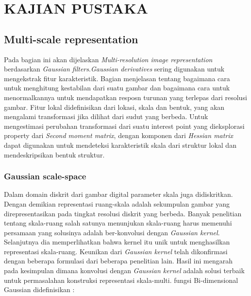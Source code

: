 
\chapter{KAJIAN PUSTAKA}

\section{\textbf{Multi-scale representation}}

Pada bagian ini akan dijelaskan \emph{Multi-resolution image representation} 
berdasarkan \emph{Gaussian filters}.\emph{Gaussian derivatives} sering digunakan untuk 
mengekstrak fitur karakteristik. Bagian menjelasan tentang 
bagaimana cara untuk menghitung kestabilan dari suatu gambar dan bagaimana 
cara untuk menormalkannya untuk mendapatkan resposn turunan yang terlepas 
dari resolusi gambar. Fitur lokal didefinisikan dari lokasi, skala dan bentuk, yang 
akan mengalami transformasi jika dilihat dari sudut yang berbeda. Untuk 
mengestimasi perubahan transformasi dari suatu interest point yang dieksplorasi 
property dari \emph{Second moment matrix}, dengan komponen dari \emph{Hessian matrix} dapat 
digunakan untuk mendeteksi karakteristik skala dari struktur lokal dan 
mendeskripsikan bentuk struktur.

\subsection{\textbf{Gaussian scale-space}}

Dalam domain diskrit dari gambar digital parameter skala juga 
didiskritkan. Dengan demikian representasi ruang-skala adalah sekumpulan 
gambar yang direpresentasikan pada tingkat resolusi diskrit yang berbeda. 
Banyak penelitian tentang skala-ruang salah satunya menunjukan skala-ruang harus 
memenuhi persamaan yang solusinya adalah ber-konvolusi dengan \emph{Gaussian 
kernel}. Selanjutnya dia memperlihatkan bahwa kernel itu unik untuk 
menghasilkan representasi skala-ruang. Keunikan dari \emph{Gaussian kernel} telah 
dikonfirmasi dengan beberapa formulasi dari beberapa penelitian lain. Hasil ini 
mengarah pada kesimpulan dimana konvolusi dengan \emph{Gaussian kernel} adalah 
solusi terbaik untuk permasalahan konstruksi representasi skala-multi. fungsi 
Bi-dimensional Gaussian didefinisikan :

